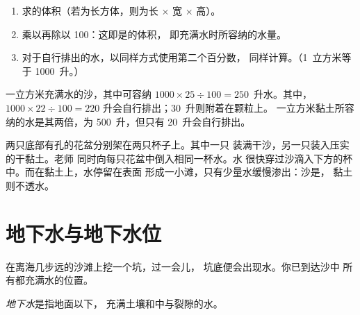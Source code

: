 \begin{method}[岩石能容纳多少水？]\label{met:g6:water-underground:volume}
\begin{enumerate}
  \item 求的体积（若为长方体，则为长 $\times$ 宽
        $\times$ 高）。
  \item 乘以再除以 100：这即是的体积，
        即充满水时所容纳的水量。
  \item 对于自行排出的水，以同样方式使用第二个百分数，
        同样计算。（1~立方米等于 1000~升。）
\end{enumerate}
\end{method}

\begin{example}[一立方米的沙]\label{ex:g6:water-underground:sand}
一立方米充满水的沙，其中可容纳 $1000 \times 25 \div 100 =
250$~升水。其中，$1000 \times 22 \div 100 = 220$
升会自行排出；30~升则附着在颗粒上。
一立方米黏土所容纳的水是其两倍，为 500~升，但只有
20~升会自行排出。
\end{example}

\begin{inthelab}
两只底部有孔的花盆分别架在两只杯子上。其中一只
装满干沙，另一只装入压实的干黏土。老师
同时向每只花盆中倒入相同一杯水。水
很快穿过沙滴入下方的杯中。而在黏土上，水停留在表面
形成一小滩，只有少量水缓慢渗出：沙是，
黏土则不透水。
\end{inthelab}

\section{地下水与地下水位}

在离海几步远的沙滩上挖一个坑，过一会儿，
坑底便会出现水。你已到达沙中
所有都充满水的位置。

\begin{definition}[地下水]\label{def:g6:water-underground:groundwater}
\emph{地下水}是指地面以下，
充满土壤和中与裂隙的水。
\end{definition}

